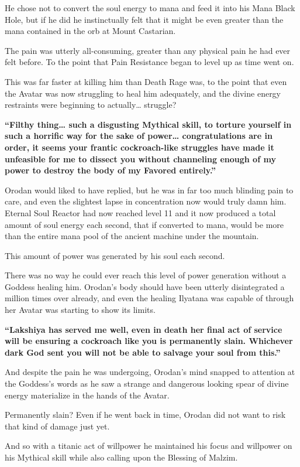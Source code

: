 \documentclass[a4paper,10pt]{book}
\begin{document}
He chose not to convert the soul energy to mana and feed it into his Mana Black Hole, but if he did he instinctually felt that it might be even greater than the mana contained in the orb at Mount Castarian.\par
The pain was utterly all-consuming, greater than any physical pain he had ever felt before. To the point that Pain Resistance began to level up as time went on.\par
This was far faster at killing him than Death Rage was, to the point that even the Avatar was now struggling to heal him adequately, and the divine energy restraints were beginning to actually… struggle?\par
\textbf{“Filthy thing… such a disgusting Mythical skill, to torture yourself in such a horrific way for the sake of power… congratulations are in order, it seems your frantic cockroach-like struggles have made it unfeasible for me to dissect you without channeling enough of my power to destroy the body of my Favored entirely.”}\par
Orodan would liked to have replied, but he was in far too much blinding pain to care, and even the slightest lapse in concentration now would truly damn him. Eternal Soul Reactor had now reached level 11 and it now produced a total amount of soul energy each second, that if converted to mana, would be more than the entire mana pool of the ancient machine under the mountain.\par
This amount of power was generated by his soul each second.\par
There was no way he could ever reach this level of power generation without a Goddess healing him. Orodan’s body should have been utterly disintegrated a million times over already, and even the healing Ilyatana was capable of through her Avatar was starting to show its limits.\par
\textbf{“Lakshiya has served me well, even in death her final act of service will be ensuring a cockroach like you is permanently slain. Whichever dark God sent you will not be able to salvage your soul from this.”}\par
And despite the pain he was undergoing, Orodan’s mind snapped to attention at the Goddess’s words as he saw a strange and dangerous looking spear of divine energy materialize in the hands of the Avatar.\par
Permanently slain? Even if he went back in time, Orodan did not want to risk that kind of damage just yet.\par
And so with a titanic act of willpower he maintained his focus and willpower on his Mythical skill while also calling upon the Blessing of Malzim.\par
\end{document}
